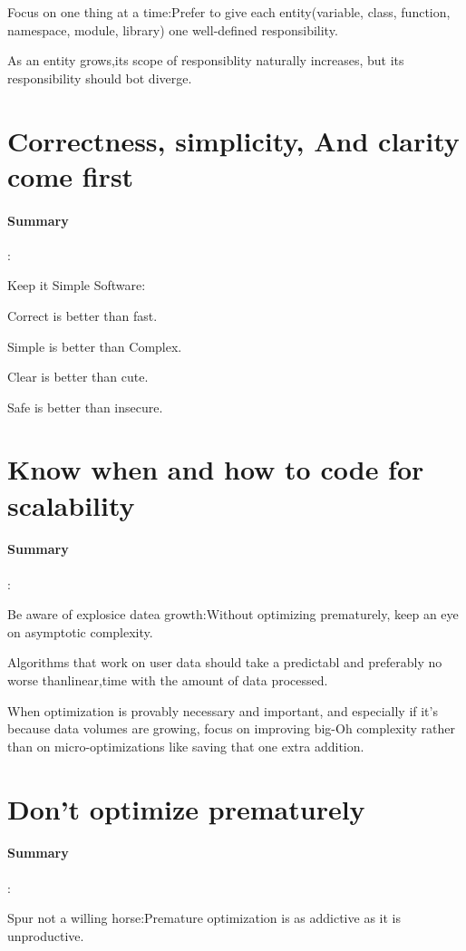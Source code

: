 \documentclass[UTF8,a4paper,12pt]{ctexbook}
\begin{document}
			Focus on one thing at a time:Prefer to give each entity(variable, class, function, namespace, module, library) one well-defined responsibility.
			
			As an entity grows,its scope of responsiblity naturally increases, but its responsibility should bot diverge.
	\section{Correctness, simplicity, And clarity come first}
		\paragraph{Summary}:
			
			Keep it Simple Software:
			
			Correct is better than fast.
			
			Simple is better than Complex.
			
			Clear is better than cute.
			
			Safe is better than insecure.
		
	\section{Know when and how to code for scalability}
		\paragraph{Summary}:
			
			Be aware of explosice datea growth:Without optimizing prematurely, keep an eye on asymptotic complexity.
			
			Algorithms that work on user data should take a predictabl and preferably no worse thanlinear,time with the amount of data processed.
			
			When optimization is provably necessary and important, and especially if it's because data volumes are growing, focus on improving big-Oh complexity rather than on micro-optimizations like saving that one extra addition.
			
			
	\section{Don't optimize prematurely}
		\paragraph{Summary}:
		
			Spur not a willing horse:Premature optimization is as addictive as it is unproductive.
			
\end{document}
